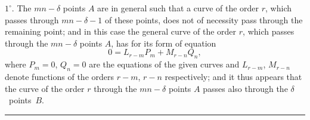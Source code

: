 \documentclass[11pt,a4paper]{article}
\theoremstyle{definition}
\begin{document}
$1^\circ$. The $mn - \delta$ points $A$ are in general such that a curve of the order $r$, which passes through $mn - \delta - 1$ of these points, does not of necessity pass through the remaining point; and in this case the general curve of the order $r$, which passes through the $mn - \delta$ points $A$, has for its form of equation
\[0 = L_{r-m}P_m + M_{r-n}Q_n,\]
where $P_m = 0$, $Q_n = 0$ are the equations of the given curves and $L_{r-m}$, $M_{r-n}$ denote functions of the orders $r - m$, $r - n$ respectively; and it thus appears that the curve of the order $r$ through the $mn - \delta$ points $A$ passes also through the $\delta$~points~$B$.

\vspace{12pt}
\hrule
\end{document}
